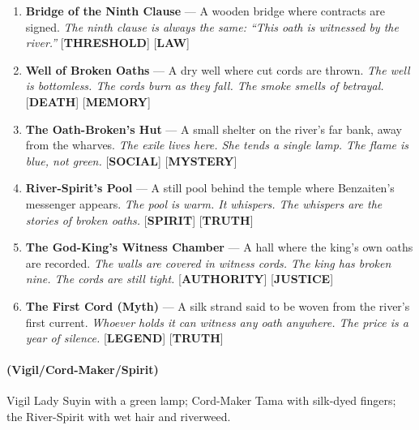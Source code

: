 \begin{enumerate}
\item \textbf{Bridge of the Ninth Clause} --- A wooden bridge where contracts are signed.
  \hfill \textit{The ninth clause is always the same: ``This oath is witnessed by the river.''} [\textbf{THRESHOLD}] [\textbf{LAW}]
\item \textbf{Well of Broken Oaths} --- A dry well where cut cords are thrown.
  \hfill \textit{The well is bottomless. The cords burn as they fall. The smoke smells of betrayal.} [\textbf{DEATH}] [\textbf{MEMORY}]
\item[J] \textbf{The Oath-Broken's Hut} --- A small shelter on the river's far bank, away from the wharves.
  \hfill \textit{The exile lives here. She tends a single lamp. The flame is blue, not green.} [\textbf{SOCIAL}] [\textbf{MYSTERY}]
\item[Q] \textbf{River-Spirit's Pool} --- A still pool behind the temple where Benzaiten's messenger appears.
  \hfill \textit{The pool is warm. It whispers. The whispers are the stories of broken oaths.} [\textbf{SPIRIT}] [\textbf{TRUTH}]
\item[K] \textbf{The God-King's Witness Chamber} --- A hall where the king's own oaths are recorded.
  \hfill \textit{The walls are covered in witness cords. The king has broken nine. The cords are still tight.} [\textbf{AUTHORITY}] [\textbf{JUSTICE}]
\item[A] \textbf{The First Cord (Myth)} --- A silk strand said to be woven from the river's first current.
  \hfill \textit{Whoever holds it can witness any oath anywhere. The price is a year of silence.} [\textbf{LEGEND}] [\textbf{TRUTH}]
\end{enumerate}

\paragraph*{(Vigil/Cord-Maker/Spirit)} Vigil Lady Suyin with a green lamp; Cord-Maker Tama with silk-dyed fingers; the River-Spirit with wet hair and riverweed.

